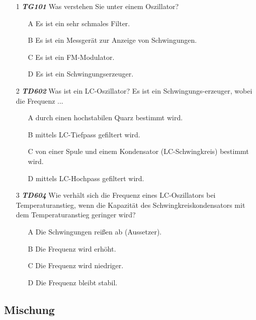 \begin{enumerate} 
	\item[1] \emph{\textbf{TG101}} Was verstehen Sie unter einem Oszillator?
	\begin{enumerate}
	\itemsep1pt\parskip0pt
		\item[A] Es ist ein sehr schmales Filter.
		\item[B] Es ist ein Messgerät zur Anzeige von Schwingungen.
		\item[C] Es ist ein FM-Modulator.
		\item[D] Es ist ein Schwingungserzeuger.
	\end{enumerate} 
	\item[2] \emph{\textbf{TD602}}  Was ist ein LC-Oszillator? Es ist ein Schwingungs-erzeuger, wobei die Frequenz ...
	\begin{enumerate}
	\itemsep1pt\parskip0pt
		\item[A] durch einen hochstabilen Quarz bestimmt wird.
		\item[B] mittels LC-Tiefpass gefiltert wird.
		\item[C] von einer Spule und einem Kondensator (LC-Schwingkreis) bestimmt wird.
		\item[D] mittels LC-Hochpass gefiltert wird.
	\end{enumerate} 
	\item[3] \emph{\textbf{TD604}}  Wie verhält sich die Frequenz eines LC-Oszillators bei Temperaturanstieg, wenn die Kapazität des Schwingkreiskondensators mit dem Temperaturanstieg geringer wird?
	\begin{enumerate}
	\itemsep1pt\parskip0pt
		\item[A] Die Schwingungen reißen ab (Aussetzer).
		\item[B] Die Frequenz wird erhöht.
		\item[C] Die Frequenz wird niedriger.
		\item[D] Die Frequenz bleibt stabil.
	\end{enumerate} 
\end{enumerate}

\subsection*{Mischung}

